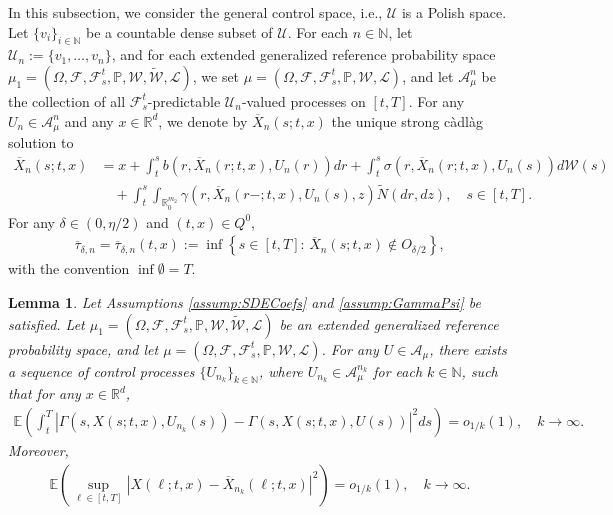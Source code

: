 \documentclass[amscd,amssymb,11pt]{article}
\newtheorem{lemma}[theorem]{Lemma}
\numberwithin{theorem}{section}
\numberwithin{equation}{section}
\begin{document}
In this subsection, we consider the general control space, i.e., $\mathcal{U}$ is a Polish space. Let $\{v_{i}\}_{i\in\mathbb{N}}$ be a countable dense subset of $\mathcal{U}$. For each $n\in\mathbb{N}$, let $\mathcal{U}_{n}:=\{v_{1},\ldots,v_{n}\}$, and for each extended generalized reference probability space $\mu_{1}=(\Omega,\mathscr{F},\mathscr{F}_{s}^{t},\mathbb{P},\mathcal{W},\widetilde{\mathcal{W}},\mathcal{L})$, we set $\mu=(\Omega,\mathscr{F},\mathscr{F}_{s}^{t},\mathbb{P},\mathcal{W},\mathcal{L})$, and let $\mathcal{A}_{\mu}^{n}$ be the collection of all $\mathscr{F}_{s}^{t}$-predictable $\mathcal{U}_{n}$-valued processes on $[t,T]$. For any $U_{n}\in\mathcal{A}_{\mu}^{n}$ and any $x\in\mathbb{R}^{d}$, we denote by $\overline{X}_{n}(s;t,x)$ the unique strong c\`{a}dl\`{a}g solution to
\begin{align}
\overline{X}_{n}(s;t,x)&=x+\int_{t}^{s}b\left(r,\overline{X}_{n}(r;t,x),U_{n}(r)\right)dr+\int_{t}^{s}\sigma\left(r,\overline{X}_{n}(r;t,x),U_{n}(s)\right)d\mathcal{W}(s)\nonumber\\
\label{eq:MainSDEsUn} &\quad+\int_{t}^{s}\int_{\mathbb{R}_{0}^{m_{2}}}\gamma\left(r,\overline{X}_{n}(r-;t,x),U_{n}(s),z\right)\widetilde{N}(dr,dz),\quad s\in[t,T].
\end{align}
For any $\delta\in(0,\eta/2)$ and $(t,x)\in Q^0$,
\begin{align*}
\overline{\tau}_{\delta,n}=\overline{\tau}_{\delta,n}(t,x):=\inf\left\{s\in[t,T]:\,\overline{X}_{n}(s;t,x)\not\in O_{\delta/2}\right\},
\end{align*}
with the convention $\inf\emptyset=T$.
\begin{lemma}\label{lem:ApproControl}
Let Assumptions \ref{assump:SDECoefs} and \ref{assump:GammaPsi} be satisfied. Let
$\mu_{1}=(\Omega,\mathscr{F},\mathscr{F}_{s}^{t},\mathbb{P},\mathcal{W},\widetilde{\mathcal{W}},\mathcal{L})$ be an extended generalized reference probability space, and let $\mu=(\Omega,\mathscr{F},\mathscr{F}_{s}^{t},\mathbb{P},\mathcal{W},\mathcal{L})$. For any $U\in\mathcal{A}_{\mu}$, there exists a sequence of control processes $\{U_{n_{k}}\}_{k\in\mathbb{N}}$, where $U_{n_{k}}\in\mathcal{A}_{\mu}^{n_{k}}$ for each $k\in\mathbb{N}$, such that for any $x\in\mathbb{R}^{d}$,
\begin{align}\label{eq:ApproxGammaFinControl}
\mathbb{E}\left(\int_{t}^{T}\left|\Gamma\left(s,X(s;t,x),U_{n_{k}}(s)\right)-\Gamma\left(s,X(s;t,x),U(s)\right)\right|^{2}ds\right)=o_{1/k}(1),\quad k\rightarrow\infty.
\end{align}
Moreover,
\begin{align}\label{eq:ApproxSDESolsFinControl}
\mathbb{E}\left(\sup_{\ell\in[t,T]}\left|X(\ell;t,x)-\overline{X}_{n_{k}}(\ell;t,x)\right|^{2}\right)=o_{1/k}(1),\quad k\rightarrow\infty.
\end{align}
\end{lemma}
\end{document}
